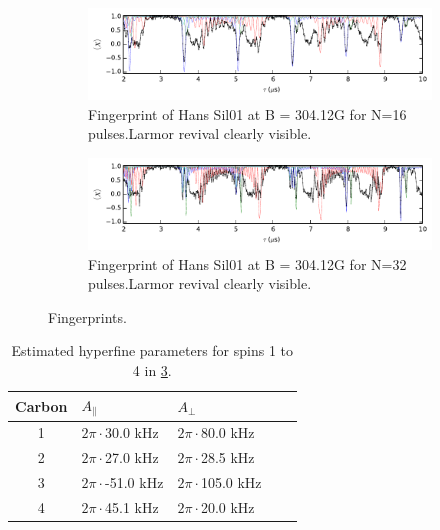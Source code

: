 \begin{figure}[t]

    \begin{subfigure}[t]{\textwidth}\centering
        \centering
        \includegraphics{Img/fingerprint16.pdf}
        \caption{Fingerprint of Hans Sil01 at B = 304.12G for N=16 pulses.Larmor revival clearly visible. }
        \label{fig:FP16}
    \end{subfigure}

    \begin{subfigure}[t]{\textwidth}\centering
        \centering
        \includegraphics{Img/fingerprint32.pdf}
        \caption{Fingerprint of Hans Sil01 at B = 304.12G for N=32 pulses.Larmor revival clearly visible. }
        \label{fig:FP32}
    \end{subfigure}
    \caption{Fingerprints. }
    \label{fig:FP}
\end{figure}




\begin{table}[htbp]
    \begin{tabular}{cllll}
    Carbon & \quad \quad  $A_{\parallel} $ & \quad \quad $A_{\perp}$ \\ \hline
    1         & $2 \pi \cdot$30.0 kHz             & $2 \pi \cdot$80.0 kHz                \\
    2         & $2 \pi \cdot$27.0 kHz             & $2 \pi \cdot$28.5 kHz              \\
    3         & $2 \pi \cdot$-51.0 kHz          & $2 \pi \cdot$105.0 kHz              \\
    4         & $2 \pi \cdot$45.1 kHz           & $2 \pi \cdot$20.0 kHz                \\
    \end{tabular}
    \caption{Estimated hyperfine parameters for spins 1 to 4 in \cref{fig:FP}.}
    \label{tbl:HF_par}
\end{table}

